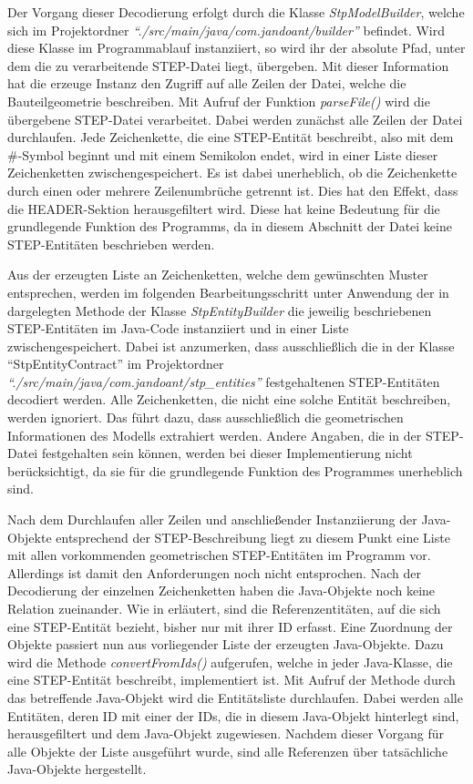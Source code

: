 Der Vorgang dieser Decodierung erfolgt durch die Klasse \textit{StpModelBuilder}, welche sich im Projektordner \textit{"`./src/main/java/com.jandoant/builder"'} befindet. 
Wird diese Klasse im Programmablauf instanziiert, so wird ihr der absolute Pfad, unter dem die zu verarbeitende STEP-Datei liegt, übergeben. Mit dieser Information hat die erzeuge Instanz den Zugriff auf alle Zeilen der Datei, welche die Bauteilgeometrie beschreiben.
Mit Aufruf der Funktion \textit{parseFile()} wird die übergebene STEP-Datei verarbeitet. Dabei werden zunächst alle Zeilen der Datei durchlaufen. Jede Zeichenkette, die eine STEP-Entität beschreibt, also mit dem \#-Symbol beginnt und mit einem Semikolon endet, wird in einer Liste dieser Zeichenketten zwischengespeichert. Es ist dabei unerheblich, ob die Zeichenkette durch einen oder mehrere Zeilenumbrüche getrennt ist. Dies hat den Effekt, dass die HEADER-Sektion herausgefiltert wird. Diese hat keine Bedeutung für die grundlegende Funktion des Programms, da in diesem Abschnitt der Datei keine STEP-Entitäten beschrieben werden.

Aus der erzeugten Liste an Zeichenketten, welche dem gewünschten Muster entsprechen, werden im folgenden Bearbeitungsschritt unter Anwendung der in  dargelegten Methode der Klasse  \textit{StpEntityBuilder} die jeweilig beschriebenen STEP-Entitäten im Java-Code instanziiert und in einer Liste zwischengespeichert. Dabei ist anzumerken, dass ausschließlich die in der Klasse "`StpEntityContract"' im Projektordner \textit{"`./src/main/java/com.jandoant/stp\_entities"'} festgehaltenen STEP-Entitäten decodiert werden. Alle Zeichenketten, die nicht eine solche Entität beschreiben, werden ignoriert. Das führt dazu, dass ausschließlich die geometrischen Informationen des Modells extrahiert werden. Andere Angaben, die in der STEP-Datei festgehalten sein können, werden bei dieser Implementierung nicht berücksichtigt, da sie für die grundlegende Funktion des Programmes unerheblich sind.

Nach dem Durchlaufen aller Zeilen und anschließender Instanziierung der Java-Objekte entsprechend der STEP-Beschreibung liegt zu diesem Punkt eine Liste mit allen vorkommenden geometrischen STEP-Entitäten im Programm vor. Allerdings ist damit den Anforderungen noch nicht entsprochen. Nach der Decodierung der einzelnen Zeichenketten haben die Java-Objekte noch keine Relation zueinander. Wie in  erläutert, sind die Referenzentitäten, auf die sich eine STEP-Entität bezieht, bisher nur mit ihrer ID erfasst. Eine Zuordnung der Objekte passiert nun aus vorliegender Liste der erzeugten Java-Objekte. 
Dazu wird die Methode \textit{convertFromIds()} aufgerufen, welche in jeder Java-Klasse, die eine STEP-Entität beschreibt, implementiert ist.
Mit Aufruf der Methode durch das betreffende Java-Objekt wird die Entitätsliste durchlaufen. Dabei werden alle Entitäten, deren ID mit einer der IDs, die in diesem Java-Objekt hinterlegt sind, herausgefiltert und dem Java-Objekt zugewiesen. Nachdem dieser Vorgang für alle Objekte der Liste ausgeführt wurde, sind alle Referenzen über tatsächliche Java-Objekte hergestellt. 

